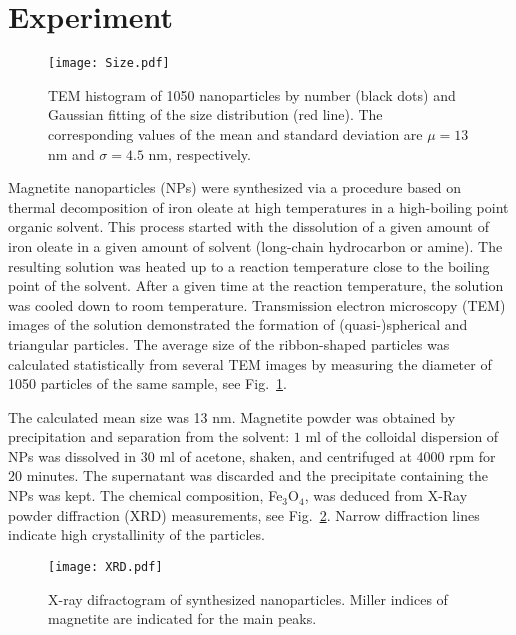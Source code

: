 \documentclass[aps,prb,floats,twocolumn]{revtex4}
\begin{document}
\section{Experiment}\label{experiment}


\begin{figure}[ht]
\begin{center}
\texttt{[image: Size.pdf]}
\caption{TEM histogram of 1050 nanoparticles by number (black dots) and Gaussian fitting of the size distribution (red line). The corresponding values of the mean and standard deviation are $\mu=13$ nm and $\sigma=4.5$ nm, respectively.}
\label{Size}
\end{center}
\end{figure}

Magnetite nanoparticles (NPs) were synthesized via a procedure based on thermal decomposition of iron oleate at high temperatures in a high-boiling point organic solvent.\cite{Park2004}  This process started with the dissolution of a given amount of iron oleate in a given amount of solvent (long-chain hydrocarbon or amine). The resulting solution was heated up to a reaction temperature close to the boiling point of the solvent. After a given time at the reaction temperature, the solution was cooled down to room temperature. Transmission electron microscopy (TEM) images of the solution demonstrated the formation of (quasi-)spherical and triangular particles. The average size of the ribbon-shaped particles was calculated statistically from several TEM images by measuring the diameter of 1050 particles of the same sample, see Fig.\ \ref{Size}. 

The calculated mean size was 13 nm.  Magnetite powder was obtained by precipitation and separation from the solvent: $1$ ml of the colloidal dispersion of NPs was dissolved in $30$ ml of acetone, shaken, and centrifuged at $4000$ rpm for $20$ minutes. The supernatant was discarded and the precipitate containing the NPs was kept. The chemical composition, Fe$_{3}$O$_{4}$, was deduced from X-Ray powder diffraction (XRD) measurements, see Fig.\ \ref{X-Ray}. Narrow diffraction lines indicate high crystallinity of the particles. 
\begin{figure}[ht]
\begin{center}
\texttt{[image: XRD.pdf]}
\caption{X-ray difractogram of synthesized nanoparticles. Miller indices of magnetite are indicated for the main peaks.}
\label{X-Ray}
\end{center}
\end{figure}
\end{document}
